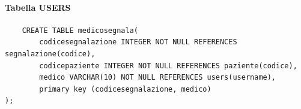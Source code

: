 \documentclass{article}
\begin{document}
\paragraph*{Tabella USERS}
\begin{verbatim}
    CREATE TABLE medicosegnala(
        codicesegnalazione INTEGER NOT NULL REFERENCES segnalazione(codice),
        codicepaziente INTEGER NOT NULL REFERENCES paziente(codice),
        medico VARCHAR(10) NOT NULL REFERENCES users(username),
        primary key (codicesegnalazione, medico)
);
\end{verbatim}
\end{document}
